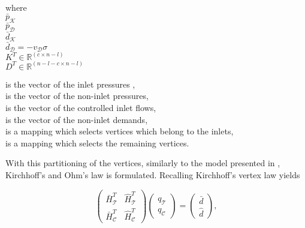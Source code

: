  \begin{minipage}[t]{0.3\textwidth}
where\\
\hspace*{8mm} $\bar{p}_{\mathcal{K}}$ \\
\hspace*{8mm} $\bar{p}_{\mathcal{D}}$  \\
\hspace*{8mm} $\bar{d}_{\mathcal{K}}$ \\
\hspace*{8mm} $\bar{d}_{\mathcal{D}} = -v_{\mathcal{D}} \sigma$  \\
\hspace*{8mm} $K^T \in  \mathbb{R}^{(c  \times n-l)}$ \\
\hspace*{8mm} $D^T \in  \mathbb{R}^{(n-l-c  \times n-l)}$
\end{minipage}
\begin{minipage}[t]{0.68\textwidth}
\vspace*{2mm}
is the vector of the inlet pressures ,\\
is the vector of the non-inlet pressures, \\
is the vector of the controlled inlet flows, \\
is the vector of the non-inlet demands, \\
is a mapping which selects vertices which belong to the inlets, \\
is a mapping which selects the remaining vertices.
\end{minipage}

With this partitioning of the vertices, similarly to the model presented in , Kirchhoff's and Ohm's law is formulated. Recalling Kirchhoff's vertex law yields

\begin{equation}
\label{kirchhoffslaw_matrix}
\begin{pmatrix}
   \bar{H}^T_{\mathcal{T}} & \hat{H}^T_{\mathcal{T}} \\[3pt]
   \bar{H}^T_{\mathcal{C}} & \hat{H}^T_{\mathcal{C}} 
   \end{pmatrix}
 \begin{pmatrix} 
 q_\mathcal{T} \\[3pt]
 q_\mathcal{C} 
 \end{pmatrix}
 =
\begin{pmatrix} 
 \bar{d}  \\[3pt] 
 \hat{d}  
 \end{pmatrix},
\end{equation}

